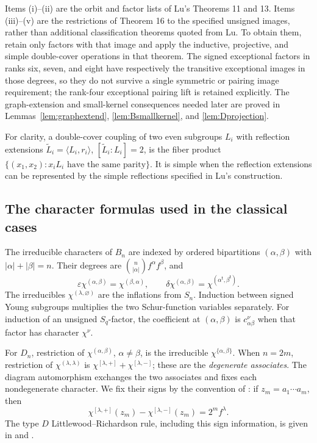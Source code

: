 \documentclass[11pt]{article}
\numberwithin{equation}{section}
\theoremstyle{definition}
\newcommand{\ee}{\varepsilon}
\newcommand{\dd}{\delta}
\newcommand{\emptypar}{\varnothing}
\newcommand{\transpose}{\mathsf t}
\begin{document}
Items (i)--(ii) are the orbit and factor lists of Lu's Theorems 11 and 13.
Items (iii)--(v) are the restrictions of Theorem 16 to the specified unsigned images, rather than additional classification theorems quoted from Lu.
To obtain them, retain only factors with that image and apply the inductive, projective, and simple double-cover operations in that theorem.
The signed exceptional factors in ranks six, seven, and eight have respectively the transitive exceptional images in those degrees, so they do not survive a single symmetric or pairing image requirement; the rank-four exceptional pairing lift is retained explicitly.
The graph-extension and small-kernel consequences needed later are proved in Lemmas~\ref{lem:graphextend}, \ref{lem:Bsmallkernel}, and \ref{lem:Dprojection}.

For clarity, a double-cover coupling of two even subgroups \(L_i\) with reflection extensions
\(\widetilde L_i=\langle L_i,r_i\rangle\), \([\widetilde L_i:L_i]=2\), is the fiber product
\(\{(x_1,x_2):x_iL_i\text{ have the same parity}\}\).
It is simple when the reflection extensions can be represented by the simple reflections specified in Lu's construction.

\subsection{The character formulas used in the classical cases}
\label{subsec:charformulas}

The irreducible characters of \(B_n\) are indexed by ordered bipartitions
\((\alpha,\beta)\) with \(|\alpha|+|\beta|=n\).
Their degrees are
\(\binom n{|\alpha|}f^\alpha f^\beta\), and
\[
 \ee\chi^{(\alpha,\beta)}=\chi^{(\beta,\alpha)},\qquad
 \dd\chi^{(\alpha,\beta)}=\chi^{(\alpha^\transpose,\beta^\transpose)}.
\]
The irreducibles \(\chi^{(\lambda,\emptypar)}\) are the inflations from \(S_n\).
Induction between signed Young subgroups multiplies the two Schur-function variables separately.
For induction of an unsigned \(S_q\)-factor, the coefficient at \((\alpha,\beta)\) is \(c^\nu_{\alpha\beta}\) when that factor has character \(\chi^\nu\).

For \(D_n\), restriction of \(\chi^{(\alpha,\beta)}\), \(\alpha\ne\beta\), is the irreducible
\(\chi^{\{\alpha,\beta\}}\).
When \(n=2m\), restriction of \(\chi^{(\lambda,\lambda)}\) is
\(\chi^{[\lambda,+]}+\chi^{[\lambda,-]}\); these are the \emph{degenerate associates}.
The diagram automorphism exchanges the two associates and fixes each nondegenerate character.
We fix their signs by the convention of \cite[Section 5.1]{MZperfect}:
if \(z_m=a_1\cdots a_m\), then
\begin{equation}
 \chi^{[\lambda,+]}(z_m)-\chi^{[\lambda,-]}(z_m)=2^m f^\lambda .
 \label{eq:associate-sign}
\end{equation}
The type \(D\) Littlewood--Richardson rule, including this sign information, is given in \cite{Taylor} and \cite[(5.8)]{MZperfect}.
\end{document}

